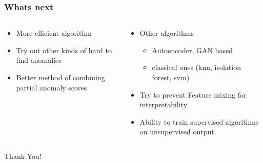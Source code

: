 \documentclass[hyperref={pdfpagelabels=false}]{beamer}
\begin{document}
\begin{frame}[label=Whats next]
\frametitle{Whats next}
\begin{columns}[c] %
\begin{column}{0.48\textwidth}%
\begin{itemize}

    \item More efficient algorithm

    \item Try out other kinds of hard to find anomalies

    \item Better method of combining partial anomaly scores


\end{itemize}
\end{column}%
\hfill%
\begin{column}{0.48\textwidth}%
\begin{itemize}

    \item Other algorithms

\begin{itemize}

    \item Autoencoder, GAN based

    \item classical ones (knn, isolation forest, svm)


\end{itemize}
    \item Try to prevent Feature mixing for interpretability

    \item Ability to train supervised algorithms on unsupervised output


\end{itemize}
\end{column}%
\hfill%
\end{columns}

\end{frame}



\begin{frame}[noframenumbering]%
\begin{center}
\Huge Thank You!
\end{center}
\end{frame}
\end{document}
